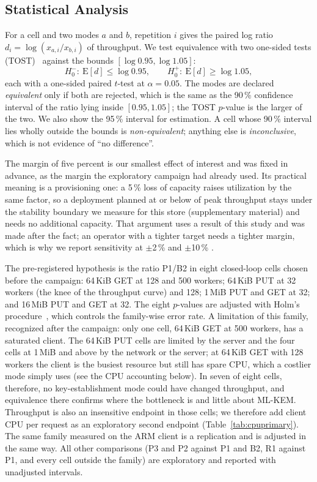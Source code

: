 \documentclass[review,12pt]{elsarticle}
\begin{document}
\subsection{Statistical Analysis}\label{sec:tost}\label{sec:cpumethod}\label{sec:deviations}
For a cell and two modes $a$ and $b$, repetition $i$ gives the paired log ratio
$d_i=\log(x_{a,i}/x_{b,i})$ of throughput. We test equivalence with two one-sided tests
(TOST)~\cite{schuirmann1987,dixon2018} against the bounds $[\log 0.95,\log 1.05]$:
\[H_0^{-}:\ \mathrm{E}[d]\le\log 0.95,\qquad H_0^{+}:\ \mathrm{E}[d]\ge\log 1.05,\]
each with a one-sided paired $t$-test at $\alpha=0.05$. The modes are declared \emph{equivalent}
only if both are rejected, which is the same as the 90\,\% confidence interval of the ratio lying
inside $[0.95,1.05]$; the TOST $p$-value is the larger of the two. We also show the 95\,\%
interval for estimation. A cell whose 90\,\% interval lies wholly outside the bounds is
\emph{non-equivalent}; anything else is \emph{inconclusive}, which is not evidence of ``no
difference''.

The margin of five percent is our smallest effect of interest and was fixed in advance, as the
margin the exploratory campaign had already used. Its practical meaning is a provisioning one: a
5\,\% loss of capacity raises utilization by the same factor, so a deployment planned at or
below \RevMarginUtil{} of peak throughput stays under the stability boundary we measure for
this store (supplementary material) and needs no additional capacity. That argument uses a result of this
study and was made after the fact; an operator with a tighter target needs a tighter margin,
which is why we report sensitivity at $\pm$2\,\% and $\pm$10\,\%
\cite{lakens2017}.

The pre-registered hypothesis is the ratio P1/B2 in eight
closed-loop cells chosen before the campaign: 64\,KiB GET at 128 and 500 workers; 64\,KiB PUT at
32 workers (the knee of the throughput curve) and 128; 1\,MiB PUT and GET at 32; and 16\,MiB PUT
and GET at 32. The eight $p$-values are adjusted with Holm's procedure~\cite{holm1979}, which
controls the family-wise error rate. A limitation of this family, recognized after the
campaign: only one cell, 64\,KiB GET at 500 workers, has a saturated client. The 64\,KiB PUT
cells are limited by the server and the four cells at 1\,MiB and above by the network or the
server; at 64\,KiB GET with 128 workers the client is the busiest resource but still has spare
CPU, which a costlier mode simply uses (see the CPU accounting below). In seven of eight cells,
therefore, no key-establishment mode could have changed throughput, and equivalence there
confirms where the bottleneck is and little about ML-KEM. Throughput is also
an insensitive endpoint in those cells; we therefore add client CPU per request as an
exploratory second endpoint (Table~\ref{tab:cpuprimary}). The same family measured on the ARM client is a replication
and is adjusted in the same way. All other comparisons (P3 and P2 against P1 and B2, R1 against
P1, and every cell outside the family) are exploratory and reported with unadjusted intervals.
\end{document}
